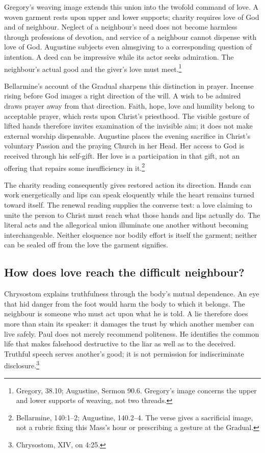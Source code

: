 Gregory's weaving image extends this union into the twofold command
of love. A woven garment rests upon upper and lower supports; charity
requires love of God and of neighbour. Neglect of a neighbour's need
does not become harmless through professions of devotion, and service
of a neighbour cannot dispense with love of God. Augustine subjects
even almsgiving to a corresponding question of intention. A deed can
be impressive while its actor seeks admiration. The neighbour's
actual good and the giver's love must meet.\footnote{Gregory,
 38.10; Augustine, Sermon 90.6. Gregory's
image concerns the upper and lower supports of weaving, not two threads.}

Bellarmine's account of the Gradual sharpens this distinction in
prayer. Incense rising before God images a right direction of the
will. A wish to be admired draws prayer away from that direction.
Faith, hope, love and humility belong to acceptable prayer, which
rests upon Christ's priesthood. The visible gesture of lifted hands
therefore invites examination of the invisible aim; it does not
make external worship dispensable. Augustine places the evening
sacrifice in Christ's voluntary Passion and the praying Church in
her Head. Her access to God is received through his self-gift.
Her love is a participation in that gift, not an offering that repairs
some insufficiency in it.\footnote{Bellarmine,  140:1--2;
Augustine,  140.2--4. The verse gives a sacrificial
image, not a rubric fixing this Mass's hour or prescribing a gesture
at the Gradual.}

The charity reading consequently gives restored action its direction.
Hands can work energetically and lips can speak eloquently while the
heart remains turned toward itself. The renewal reading supplies
the converse test: a love claiming to unite the person to Christ
must reach what those hands and lips actually do. The literal acts
and the allegorical union illuminate one another without becoming
interchangeable. Neither eloquence nor bodily effort is itself the
garment; neither can be sealed off from the love the garment signifies.

\subsection{How does love reach the difficult neighbour?}

Chrysostom explains truthfulness through the body's mutual dependence.
An eye that hid danger from the foot would harm the body to which
it belongs. The neighbour is someone who must act upon what he is
told. A lie therefore does more than stain its speaker: it damages
the trust by which another member can live safely. Paul does not
merely recommend politeness. He identifies the common life that
makes falsehood destructive to the liar as well as to the deceived.
Truthful speech serves another's good; it is not permission for
indiscriminate disclosure.\footnote{Chrysostom, 
XIV, on 4:25.}


